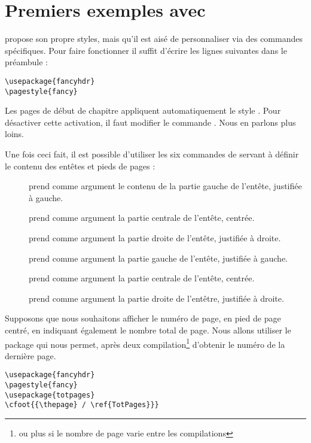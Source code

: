 \section{Premiers exemples avec }

 propose son propre styles, mais qu'il est aisé de personnaliser via des commandes spécifiques. Pour faire fonctionner  il suffit d'écrire les lignes suivantes dans le préambule :
\begin{verbatim}
\usepackage{fancyhdr}
\pagestyle{fancy}
\end{verbatim}

\begin{anedocte}
Les pages de début de chapitre appliquent automatiquement le style . Pour désactiver cette activation, il faut modifier le commande . Nous en parlons plus loins. 
\end{anedocte}


Une fois ceci fait, il est possible d'utiliser les six commandes de  servant à définir le contenu des entêtes et pieds de pages :

\begin{description}
\item[]prend comme argument le contenu de la partie gauche de l'entête, justifiée à gauche.
\item[]prend comme argument la partie centrale de l'entête, centrée.
\item[]prend comme argument la partie droite de l'entête, justifiée à droite.
\item[]prend comme argument la partie gauche de l'entête, justifiée à gauche.
\item[]prend comme argument la partie centrale de l'entête, centrée.
\item[]prend comme argument la partie droite de l'entêtre, justifiée à droite.
\end{description}



Supposons que nous souhaitons afficher le numéro de page, en pied de page centré, en indiquant également le nombre total de page. Nous allons utiliser le package  qui nous permet, après deux compilation\footnote{ou plus si le nombre de page varie entre les compilations} d'obtenir le numéro de la dernière page.
\begin{verbatim}
\usepackage{fancyhdr}
\pagestyle{fancy}
\usepackage{totpages}
\cfoot{{\thepage} / \ref{TotPages}}}
\end{verbatim}

